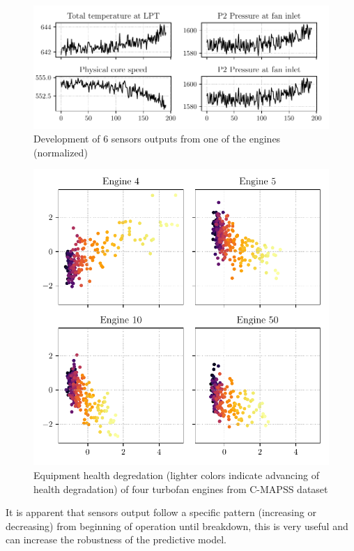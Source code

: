 \begin{figure}[h]
    \centering
    \includegraphics[width=\linewidth]{figures/plots/sensors_plot.pdf}
    \caption{Development of 6 sensors outputs from one of the engines (normalized)}
    \label{fig:sensors-plot}
\end{figure}
\begin{figure}[H]
    \centering
    \includegraphics[width=.9\linewidth]{figures/plots/pca-degradation.pdf}
    \caption{Equipment health degredation (lighter colors indicate advancing of health degradation) of four turbofan engines from C-MAPSS dataset}
    \label{fig:pca-degradation}
\end{figure}

It is apparent that sensors output follow a specific pattern (increasing or decreasing) from beginning of operation until breakdown, this is very useful and can increase the robustness of the predictive model.

